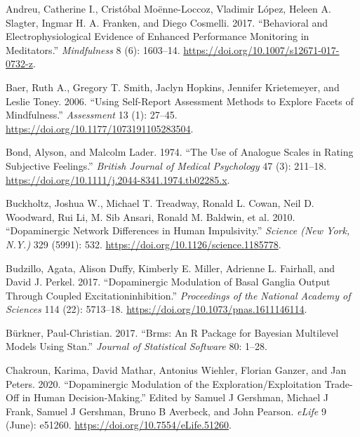 \documentclass{article}
\newlength{\cslhangindent}
\newlength{\cslentryspacingunit} %
\newenvironment{CSLReferences}[2] %
 {%
  \setlength{\parindent}{0pt}
  \ifodd #1
  \let\oldpar\par
  \def\par{\hangindent=\cslhangindent\oldpar}
  \fi
  \setlength{\parskip}{#2\cslentryspacingunit}
 }%
 {}
\begin{document}
\hypertarget{refs}{}
\begin{CSLReferences}{1}{0}
\leavevmode{}%
Andreu, Catherine I., Cristóbal Moënne-Loccoz, Vladimir López, Heleen A.
Slagter, Ingmar H. A. Franken, and Diego Cosmelli. 2017. {``Behavioral
and {Electrophysiological Evidence} of {Enhanced Performance Monitoring}
in {Meditators}.''} \emph{Mindfulness} 8 (6): 1603--14.
\url{https://doi.org/10.1007/s12671-017-0732-z}.

\leavevmode{}%
Baer, Ruth A., Gregory T. Smith, Jaclyn Hopkins, Jennifer Krietemeyer,
and Leslie Toney. 2006. {``Using {Self-Report Assessment Methods} to
{Explore Facets} of {Mindfulness}.''} \emph{Assessment} 13 (1): 27--45.
\url{https://doi.org/10.1177/1073191105283504}.

\leavevmode{}%
Bond, Alyson, and Malcolm Lader. 1974. {``The Use of Analogue Scales in
Rating Subjective Feelings.''} \emph{British Journal of Medical
Psychology} 47 (3): 211--18.
\url{https://doi.org/10.1111/j.2044-8341.1974.tb02285.x}.

\leavevmode{}%
Buckholtz, Joshua W., Michael T. Treadway, Ronald L. Cowan, Neil D.
Woodward, Rui Li, M. Sib Ansari, Ronald M. Baldwin, et al. 2010.
{``Dopaminergic Network Differences in Human Impulsivity.''}
\emph{Science (New York, N.Y.)} 329 (5991): 532.
\url{https://doi.org/10.1126/science.1185778}.

\leavevmode{}%
Budzillo, Agata, Alison Duffy, Kimberly E. Miller, Adrienne L. Fairhall,
and David J. Perkel. 2017. {``Dopaminergic Modulation of Basal Ganglia
Output Through Coupled Excitation\textendash inhibition.''}
\emph{Proceedings of the National Academy of Sciences} 114 (22):
5713--18. \url{https://doi.org/10.1073/pnas.1611146114}.

\leavevmode{}%
Bürkner, Paul-Christian. 2017. {``Brms: {An R} Package for {Bayesian}
Multilevel Models Using {Stan}.''} \emph{Journal of Statistical
Software} 80: 1--28.

\leavevmode{}%
Chakroun, Karima, David Mathar, Antonius Wiehler, Florian Ganzer, and
Jan Peters. 2020. {``Dopaminergic Modulation of the
Exploration/Exploitation Trade-Off in Human Decision-Making.''} Edited
by Samuel J Gershman, Michael J Frank, Samuel J Gershman, Bruno B
Averbeck, and John Pearson. \emph{eLife} 9 (June): e51260.
\url{https://doi.org/10.7554/eLife.51260}.


\end{CSLReferences}
\end{document}
